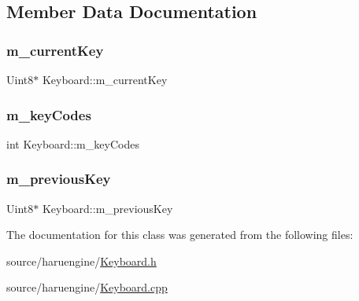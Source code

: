 \subsection{Member Data Documentation}
\mbox{\label{class_keyboard_ab8f8001628685fcda41978d5bdbb051d}} 
\subsubsection{\texorpdfstring{m\+\_\+current\+Key}{m\_currentKey}}
{\footnotesize\ttfamily Uint8$\ast$ Keyboard\+::m\+\_\+current\+Key\hspace{0.3cm}{\ttfamily [private]}}

\mbox{\label{class_keyboard_a24b47a8a4639abfaca8347c6b16a5b4b}} 
\subsubsection{\texorpdfstring{m\+\_\+key\+Codes}{m\_keyCodes}}
{\footnotesize\ttfamily int Keyboard\+::m\+\_\+key\+Codes\hspace{0.3cm}{\ttfamily [private]}}

\mbox{\label{class_keyboard_a784ec6507f874cc67f12489fe0e6deeb}} 
\subsubsection{\texorpdfstring{m\+\_\+previous\+Key}{m\_previousKey}}
{\footnotesize\ttfamily Uint8$\ast$ Keyboard\+::m\+\_\+previous\+Key\hspace{0.3cm}{\ttfamily [private]}}



The documentation for this class was generated from the following files\+:\begin{DoxyCompactItemize}
\item 
source/haruengine/\mbox{\hyperlink{_keyboard_8h}{Keyboard.\+h}}\item 
source/haruengine/\mbox{\hyperlink{_keyboard_8cpp}{Keyboard.\+cpp}}\end{DoxyCompactItemize}
